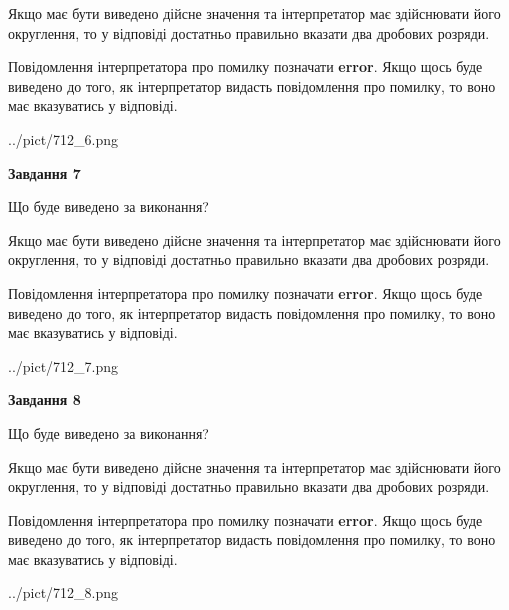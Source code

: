 \documentclass[12pt, ukrainian]{article}
\begin{document}
{\begin {Large}
Якщо має бути виведено дійсне значення та інтерпретатор має здійснювати його округлення, 
то у відповіді достатньо правильно вказати два дробових розряди.

Повідомлення інтерпретатора про помилку позначати \textbf{error}.
Якщо щось буде виведено до того, як інтерпретатор видасть повідомлення про помилку, 
то воно має вказуватись у відповіді. \par

\begin{center}
	{../pict/712_6.png}
\end{center}
\newpage

{\begin {center}\textbf{Завдання 7}\end {center}}\par
Що буде виведено за виконання? \par

Якщо має бути виведено дійсне значення та інтерпретатор має здійснювати його округлення, 
то у відповіді достатньо правильно вказати два дробових розряди.

Повідомлення інтерпретатора про помилку позначати \textbf{error}.
Якщо щось буде виведено до того, як інтерпретатор видасть повідомлення про помилку, 
то воно має вказуватись у відповіді. \par

\begin{center}
	{../pict/712_7.png}
\end{center}
\newpage

{\begin {center}\textbf{Завдання 8}\end {center}}\par
Що буде виведено за виконання? \par

Якщо має бути виведено дійсне значення та інтерпретатор має здійснювати його округлення, 
то у відповіді достатньо правильно вказати два дробових розряди.

Повідомлення інтерпретатора про помилку позначати \textbf{error}.
Якщо щось буде виведено до того, як інтерпретатор видасть повідомлення про помилку, 
то воно має вказуватись у відповіді. \par

\begin{center}
	{../pict/712_8.png}
\end{center}
\newpage


\end{Large}}
\end{document}
